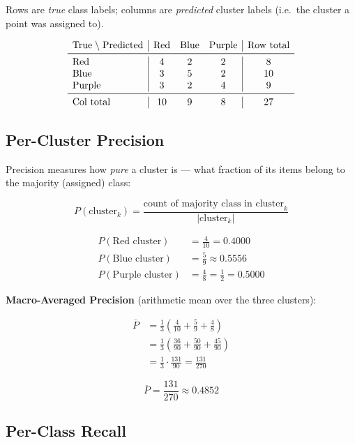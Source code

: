 \documentclass[11pt, a4paper]{article}
\begin{document}
Rows are \emph{true} class labels; columns are \emph{predicted} cluster labels
(i.e.\ the cluster a point was assigned to).

\[
\begin{array}{l|ccc|c}
\text{True} \;\backslash\; \text{Predicted}
  & \text{Red} & \text{Blue} & \text{Purple} & \text{Row total} \\
\midrule
\text{Red}       & 4 & 2 & 2 & 8  \\
\text{Blue}      & 3 & 5 & 2 & 10 \\
\text{Purple}    & 3 & 2 & 4 & 9  \\
\midrule
\text{Col total} & 10 & 9 & 8 & 27 \\
\end{array}
\]

\subsection{Per-Cluster Precision}

Precision measures how \emph{pure} a cluster is --- what fraction of its items
belong to the majority (assigned) class:

\[
  P(\text{cluster}_k)
  = \frac{\text{count of majority class in cluster}_k}{|\text{cluster}_k|}
\]

\begin{align*}
  P(\text{Red cluster})    &= \frac{4}{10} = 0.4000 \\[4pt]
  P(\text{Blue cluster})   &= \frac{5}{9}  \approx 0.5556 \\[4pt]
  P(\text{Purple cluster}) &= \frac{4}{8}  = \frac{1}{2} = 0.5000
\end{align*}

\textbf{Macro-Averaged Precision} (arithmetic mean over the three clusters):

\begin{align*}
  \overline{P}
  &= \frac{1}{3}\!\left(\frac{4}{10} + \frac{5}{9} + \frac{4}{8}\right) \\[6pt]
  &= \frac{1}{3}\!\left(\frac{36}{90} + \frac{50}{90} + \frac{45}{90}\right) \\[6pt]
  &= \frac{1}{3} \cdot \frac{131}{90}
   = \frac{131}{270}
\end{align*}

\begin{mathbox}
\[
  \overline{P} = \frac{131}{270} \approx 0.4852
\]
\end{mathbox}

\subsection{Per-Class Recall}
\end{document}
